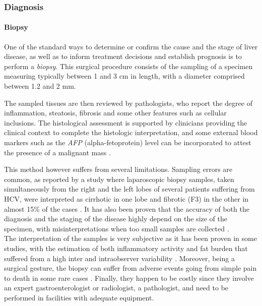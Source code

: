 \documentclass[]{article}
\let\oldparagraph\paragraph
\renewcommand{\paragraph}[1]{\oldparagraph{#1}\mbox{}}
\begin{document}
\subsubsection*{Diagnosis}\label{diagnosis}

\paragraph{Biopsy}\label{biopsy}

One of the standard ways to determine or confirm the cause and the stage
of liver disease, as well as to inform treatment decisions and establish
prognosis is to perform a \emph{biopsy}. This surgical procedure consists of the sampling of a specimen measuring typically between 1 and 3 cm in length, with a diameter comprised between 1.2 and 2 mm\cite{Bravo2001}.

The sampled tissues are then reviewed by pathologists, who report the
degree of inflammation, steatosis, fibrosis and some other features such
as cellular inclusions. The histological assessment is supported by
clinicians providing the clinical context to complete the histologic
interpretation, and some external blood markers such as the \emph{AFP}
(alpha-fetoprotein) level can be incorporated to attest the presence of
a malignant mass \cite{Bai2017a, Heimbach2018}.

This method however suffers from several limitations. Sampling errors
are common, as reported by a study where laparoscopic biopsy samples,
taken simultaneously from the right and the left lobes of several
patients suffering from HCV, were interpreted as cirrhotic in one lobe
and fibrotic (F3) in the other in almost 15\% of the cases \cite{Regev2002}. It has also been proven that the
accuracy of both the diagnosis and the staging of the disease highly
depend on the size of the specimen, with misinterpretations when too
small samples are collected \cite{Colloredo2003}.\\
The interpretation of the samples is very subjective as it has been
proven in some studies, with the estimation of both inflammatory
activity and fat burden that suffered from a high inter and
intraobserver variability \cite{Bedossa1994}.
Moreover, being a surgical gesture, the biopsy can suffer from adverse
events going from simple pain to death in some rare cases \cite{Rockey2009, Castera2001, Seeff2010, Piccinino1986}. Finally, they happen to be costly since
they involve an expert gastroenterologist or radiologist, a pathologist,
and need to be performed in facilities with adequate equipment.
\end{document}
